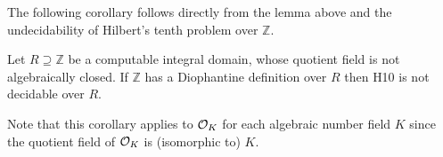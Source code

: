 The following corollary follows directly from the lemma above and the
undecidability of Hilbert's tenth problem over $ℤ$.

\begin{cor}
  Let $R \supseteq ℤ$ be a computable integral domain, whose quotient field is
  not algebraically closed. If $ℤ$ has a Diophantine definition over $R$ then
  \textsc{H10} is not decidable over $R$.
\end{cor}

Note that this corollary applies to $\mathcal{O}_{K}$ for each algebraic number field
$K$ since the quotient field of $\mathcal{O}_{K}$ is (isomorphic to) $K$.
